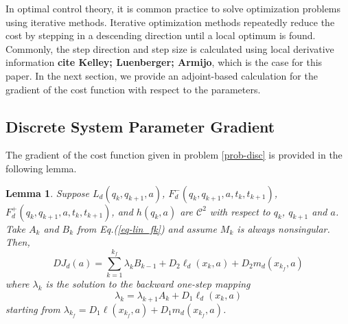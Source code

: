 \documentclass[letterpaper, 10pt, conference]{ieeeconf}
\newtheorem{lemma}{Lemma}
\begin{document}
In optimal control theory, it is common practice to solve optimization problems using iterative methods.  Iterative optimization methods repeatedly reduce the cost by stepping in a descending direction until a local optimum is found.  Commonly, the step direction and step size is calculated using local derivative information \textbf{cite Kelley; Luenberger; Armijo}, which is the case for this paper.  In the next section, we provide an adjoint-based calculation for the gradient of the cost function with respect to the parameters.

\subsection{Discrete System Parameter Gradient}
The gradient of the cost function given in problem \ref{prob-disc} is provided in the following lemma.
\begin{lemma}
\label{lem-grad_a}
Suppose $L_d(q_k,q_{k+1},a)$, $F_d^-(q_k,q_{k+1},a,t_k,t_{k+1})$, $F_d^+(q_k,q_{k+1},a,t_k,t_{k+1})$, and $h(q_k,a)$ are $\mathcal{C}^2$ with respect to $q_k$, $q_{k+1}$ and $a$.  Take $A_k$ and $B_k$ from Eq.(\ref{eq-lin_fk}) and assume $M_k$ is always nonsingular.  Then,
\begin{equation}
DJ_d(a) = \sum_{k = 1}^{k_f}\lambda_kB_{k-1} +D_2\ell_d(x_k,a) + D_2m_d(x_{k_f},a)
\label{eq-DJa}
\end{equation}
where $\lambda_k$ is the solution to the backward one-step mapping
\begin{equation}
\lambda_k = \lambda_{k+1}A_{k} + D_1\ell_d(x_{k},a) 
\label{eq-lambda}
\end{equation}
starting from $\lambda_{k_f} = D_1\ell(x_{k_f},a) + D_1m_d(x_{k_f},a)$.  
\end{lemma}
\end{document}
